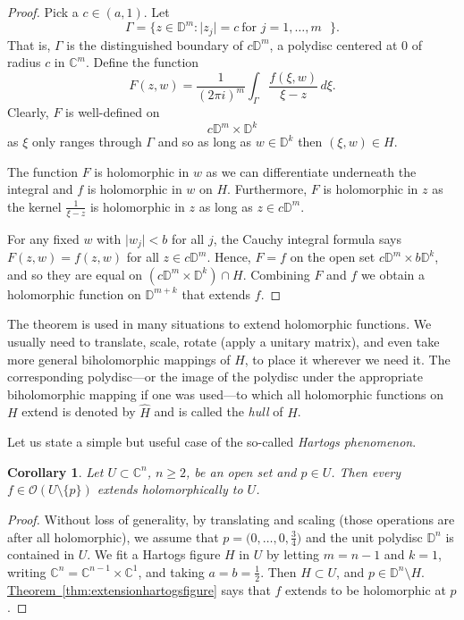 \documentclass[12pt,openany]{book}
\newcommand{\sabs}[1]{\lvert {#1} \rvert}
\newcommand{\C}{{\mathbb{C}}}
\newcommand{\D}{{\mathbb{D}}}
\newcommand{\sO}{{\mathscr{O}}}
\newcommand{\myindex}[1]{#1\index{#1}}
\theoremstyle{plain}
\newtheorem{cor}[thm]{Corollary}
\theoremstyle{remark}
\theoremstyle{definition}
\theoremstyle{exercise}
\theoremstyle{example}
\newcommand{\thmref}[1]{\hyperref[#1]{Theorem~\ref*{#1}}}
\begin{document}
\begin{proof}
Pick a $c \in (a,1)$.  Let
\begin{equation*}
\Gamma =
\bigl\{ z \in \D^{m} : \sabs{z_j} = c ~\text{for $j=1,\ldots,m$ } \bigr\}.
\end{equation*}
That is, $\Gamma$ is the distinguished boundary of $c \D^m$,
a polydisc centered at 0 of radius $c$ in $\C^m$.
Define the function
\begin{equation*}
F(z,w)
=
\frac{1}{{(2\pi i)}^m}
\int_\Gamma \frac{f(\xi,w)}{\xi-z} \, d\xi .
\end{equation*}
Clearly, $F$ is well-defined on
\begin{equation*}
c\D^m \times \D^k
\end{equation*}
as $\xi$ only
ranges through $\Gamma$ and so as long as $w \in \D^k$ then $(\xi,w) \in H$.

The function $F$ is holomorphic in $w$ as we can differentiate
underneath the integral and $f$ is holomorphic in $w$ on $H$.  Furthermore,
$F$ is holomorphic in $z$ as the kernel $\frac{1}{\xi-z}$ is holomorphic in
$z$ as long as $z \in c\D^m$.

For any fixed $w$ with $\sabs{w_j} < b$ for all $j$,
the Cauchy integral formula says
$F(z,w) = f(z,w)$ for all $z \in c \D^m$.
Hence, $F=f$ on the open set
$c\D^m \times b\D^k$,
and so they are equal on 
$(c\D^m \times \D^k) \cap H$.
Combining $F$ and $f$ we obtain a holomorphic
function on $\D^{m+k}$ that extends $f$.
\end{proof}

The theorem is used 
in many situations to extend holomorphic functions.
We usually need to
translate, scale, 
rotate (apply a unitary matrix),
and even take more general biholomorphic mappings
of $H$, to place it wherever we need it.  The corresponding polydisc---or the image of
the polydisc under the appropriate biholomorphic mapping if one was
used---to which all holomorphic functions on $H$ extend is denoted
by $\widehat{H}$ and is called the \emph{hull} of $H$.%

Let us state a simple but useful case of the so-called
\emph{\myindex{Hartogs phenomenon}}.

\begin{cor}
Let $U \subset \C^n$, $n \geq 2$, be an open set and $p \in U$.
Then every $f \in \sO(U \setminus \{ p \} )$
extends holomorphically to $U$.
\end{cor}

\begin{proof}
Without loss of generality,
by translating and scaling (those operations are after all holomorphic),
we assume that $p = \bigl(0,\ldots,0,\frac{3}{4}\bigr)$
and the unit polydisc $\D^n$ is contained in $U$.  We fit a Hartogs figure $H$
in $U$
by letting $m=n-1$ and $k=1$, writing $\C^n = \C^{n-1} \times \C^{1}$,
and taking $a = b = \frac{1}{2}$.
Then $H \subset U$, and $p \in \D^n \setminus H$.
\thmref{thm:extensionhartogsfigure} says that
$f$ extends to be holomorphic at $p$.
\end{proof}
\end{document}

